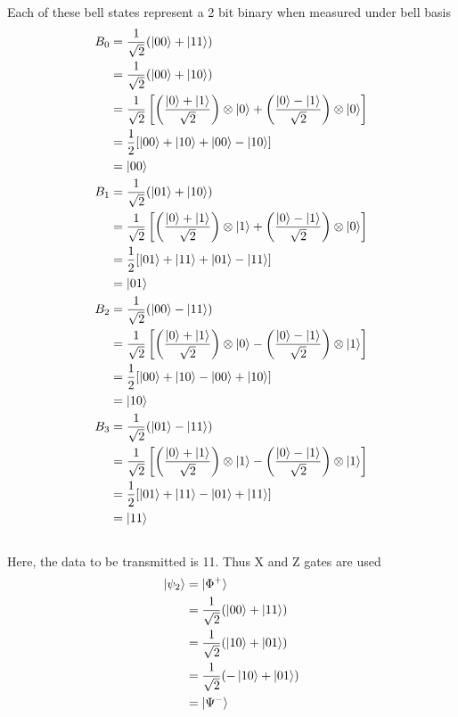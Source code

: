 \documentclass{article}
\begin{document}
  Each of these bell states represent a 2 bit binary when measured under bell basis\\
  \begin{equation*}
    \begin{split}
      B_0 & = \frac{1}{\sqrt{2}}(\ket{00} + \ket{11})\\
      & = \frac{1}{\sqrt{2}}(\ket{00} + \ket{10})\\
      & = \frac{1}{\sqrt{2}} \left[ \left( \frac{\ket{0} + \ket{1}}{\sqrt{2}} \right) \otimes \ket{0} + \left( \frac{\ket{0} - \ket{1}}{\sqrt{2}} \right) \otimes \ket{0} \right]\\
      & = \frac{1}{2} [ \ket{00} + \ket{10} + \ket{00} - \ket{10} ]\\
      & = \ket{00}\\
      B_1 & = \frac{1}{\sqrt{2}}(\ket{01} + \ket{10})\\
      & = \frac{1}{\sqrt{2}} \left[ \left( \frac{\ket{0} + \ket{1}}{\sqrt{2}} \right) \otimes \ket{1} + \left( \frac{\ket{0} - \ket{1}}{\sqrt{2}} \right) \otimes \ket{0} \right]\\
      & = \frac{1}{2} [ \ket{01} + \ket{11} + \ket{01} - \ket{11} ]\\
      & = \ket{01}\\
      B_2 & = \frac{1}{\sqrt{2}}(\ket{00} - \ket{11})\\
      & = \frac{1}{\sqrt{2}} \left[ \left( \frac{\ket{0} + \ket{1}}{\sqrt{2}} \right) \otimes \ket{0} - \left( \frac{\ket{0} - \ket{1}}{\sqrt{2}} \right) \otimes \ket{1} \right]\\
      & = \frac{1}{2} [ \ket{00} + \ket{10} - \ket{00} + \ket{10} ]\\
      & = \ket{10}\\
      B_3 & = \frac{1}{\sqrt{2}}(\ket{01} - \ket{11})\\
      & = \frac{1}{\sqrt{2}} \left[ \left( \frac{\ket{0} + \ket{1}}{\sqrt{2}} \right) \otimes \ket{1} - \left( \frac{\ket{0} - \ket{1}}{\sqrt{2}} \right) \otimes \ket{1} \right]\\
      & = \frac{1}{2} [ \ket{01} + \ket{11} - \ket{01} + \ket{11} ]\\
      & = \ket{11}
    \end{split}
  \end{equation*}\\
  Here, the data to be transmitted is 11. Thus X and Z gates are used\\
  \begin{equation*}
    \begin{split}
      \ket{\psi_2} & = \ket{\Phi^+}\\
      & = \frac{1}{\sqrt{2}}(\ket{00} + \ket{11})\\
      & = \frac{1}{\sqrt{2}}(\ket{10} + \ket{01})\\
      & = \frac{1}{\sqrt{2}}(-\ket{10} + \ket{01})\\
      & = \ket{\Psi^-}
    \end{split}
  \end{equation*}\\
\end{document}
